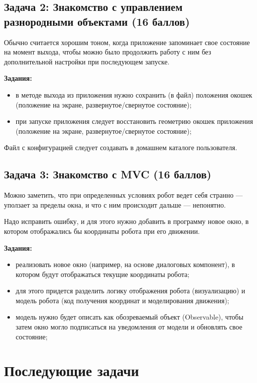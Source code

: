 \documentclass[a4paper,12pt]{article}
\begin{document}
\subsection{Задача 2: Знакомство с управлением разнородными объектами (16 баллов)}

Обычно считается хорошим тоном, когда приложение запоминает свое состояние на момент выхода, чтобы можно было продолжить работу с ним без дополнительной настройки при последующем запуске.

\textbf{Задания:}
\begin{itemize}
    \item в методе выхода из приложения нужно сохранить (в файл) положения окошек (положение на экране, развернутое/свернутое состояние);
    \item при запуске приложения следует восстановить геометрию окошек приложения (положение на экране, развернутое/свернутое состояние);
\end{itemize}
Файл с конфигурацией следует создавать в домашнем каталоге пользователя.

\subsection{Задача 3: Знакомство с MVC (16 баллов)}

Можно заметить, что при определенных условиях робот ведет себя странно — уползает за пределы окна, и что с ним происходит дальше — непонятно.

Надо исправить ошибку, и для этого нужно добавить в программу новое окно, в котором отображались бы координаты робота при его движении.

\textbf{Задания:}
\begin{itemize}
    \item реализовать новое окно (например, на основе диалоговых компонент), в котором будут отображаться текущие координаты робота;
    \item для этого придется разделить логику отображения робота (визуализацию) и модель робота (код получения координат и моделирования движения);
    \item модель нужно будет описать как обозреваемый объект (Observable), чтобы затем окно могло подписаться на уведомления от модели и обновлять свое состояние;
\end{itemize}

\section{Последующие задачи}
\end{document}
